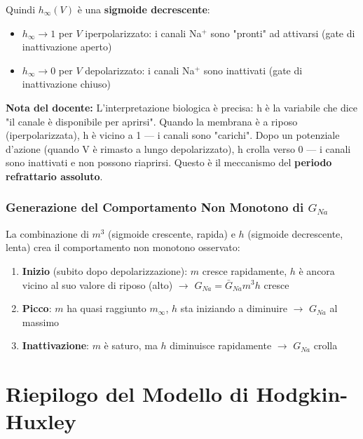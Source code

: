 Quindi $h_\infty(V)$ è una \textbf{sigmoide decrescente}:
\begin{itemize}
    \item $h_\infty \to 1$ per $V$ iperpolarizzato: i canali Na$^+$ sono "pronti" ad attivarsi (gate di inattivazione aperto)
    \item $h_\infty \to 0$ per $V$ depolarizzato: i canali Na$^+$ sono inattivati (gate di inattivazione chiuso)
\end{itemize}

\begin{tcolorbox}[colback=gray!5, colframe=gray!40, arc=2mm, boxrule=0.5pt]
\textbf{Nota del docente:} L'interpretazione biologica è precisa: h è la variabile che dice "il canale è disponibile per aprirsi". Quando la membrana è a riposo (iperpolarizzata), h è vicino a 1 — i canali sono "carichi". Dopo un potenziale d'azione (quando V è rimasto a lungo depolarizzato), h crolla verso 0 — i canali sono inattivati e non possono riaprirsi. Questo è il meccanismo del \textbf{periodo refrattario assoluto}.
\end{tcolorbox}

\subsubsection{Generazione del Comportamento Non Monotono di $G_{Na}$}

La combinazione di $m^3$ (sigmoide crescente, rapida) e $h$ (sigmoide decrescente, lenta) crea il comportamento non monotono osservato:

\begin{enumerate}
    \item \textbf{Inizio} (subito dopo depolarizzazione): $m$ cresce rapidamente, $h$ è ancora vicino al suo valore di riposo (alto) $\rightarrow$ $G_{Na} = \bar{G}_{Na} m^3 h$ cresce
    \item \textbf{Picco}: $m$ ha quasi raggiunto $m_\infty$, $h$ sta iniziando a diminuire $\rightarrow$ $G_{Na}$ al massimo
    \item \textbf{Inattivazione}: $m$ è saturo, ma $h$ diminuisce rapidamente $\rightarrow$ $G_{Na}$ crolla
\end{enumerate}



\section*{Riepilogo del Modello di Hodgkin-Huxley}


